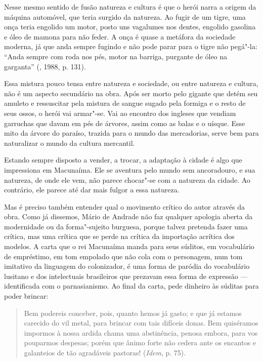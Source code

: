 Nesse mesmo sentido de fusão natureza e cultura é que o herói narra a
origem da máquina automóvel, que teria surgido da natureza. Ao fugir de
um tigre, uma onça teria engolido um motor, posto uns vagalumes nos
dentes, engolido gasolina e óleo de mamona para não feder. A onça é
quase a metáfora da sociedade moderna, já que anda sempre fugindo e não
pode parar para o tigre não pegá"-la: ``Anda sempre com roda nos pés,
motor na barriga, purgante de óleo na garganta'' (, 1988, p. 131).

Essa mistura pouco tensa entre natureza e sociedade, ou entre natureza e
cultura, não é um aspecto secundário na obra. Após ser morto pelo
gigante que detém seu amuleto e ressuscitar pela mistura de sangue
sugado pela formiga e o resto de seus ossos, o herói vai armar"-se. Vai
ao encontro dos ingleses que vendiam garruchas que davam em pés de
árvores, assim como as balas e o uísque. Esse mito da árvore do paraíso,
trazida para o mundo das mercadorias, serve bem para naturalizar o mundo
da cultura mercantil.

Estando sempre disposto a vender, a trocar, a adaptação à cidade é algo
que impressiona em Macunaíma. Ele se aventura pelo mundo sem
ancoradouro, e sua natureza, de onde ele vem, não parece chocar"-se com a
natureza da cidade. Ao contrário, ele parece até dar mais fulgor a essa
natureza.

Mas é preciso também entender qual o movimento crítico do autor através
da obra. Como já dissemos, Mário de Andrade não faz qualquer apologia
aberta da modernidade ou da forma"-sujeito burguesa, porque talvez
pretenda fazer uma crítica, mas uma crítica que se perde na crítica da
importação acrítica dos modelos. A carta que o rei Macunaíma manda para
seus súditos, em vocabulário de empréstimo, em tom empolado que não cola
com o personagem, num tom imitativo da linguagem do colonizador, é uma
forma de paródia do vocabulário lusitano e dos intelectuais brasileiros
que prezavam essa forma de expressão --- identificada com o
parnasianismo. Ao final da carta, pede dinheiro às súditas para poder
brincar:

\begin{quote}
Bem podereis conceber, pois, quanto hemos já gasto; e que já estamos
carecido do vil metal, para brincar com tais difíceis donas. Bem
quiséramos impormos à nossa ardida chama uma abstinência, penosa embora,
para vos pouparmos despesas; porém que ânimo forte não cedera ante os
encantos e galanteios de tão agradáveis pastoras! (\emph{Idem}, p. 75).
\end{quote}

